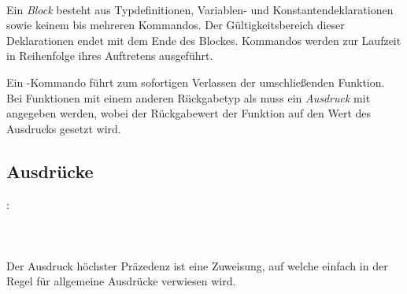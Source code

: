 \hspace*{1cm}\glq{}\grq {}  \glq\Gt{;}\grq \\
\hspace*{1cm} \\
\hspace*{1cm} \\
\hspace*{1cm} \\
\hspace*{1cm}\glq\Gt{\{}\grq  \glq\Gt{\}}\grq \\
\hspace*{1cm}\glq\Gt{\{}\grq {}  \glq\Gt{\}}\grq \\

Ein \emph{Block} besteht aus Typdefinitionen, Variablen- und Konstantendeklarationen sowie keinem bis mehreren Kommandos.
Der Gültigkeitsbereich dieser Deklarationen endet mit dem Ende des Blockes. Kommandos werden zur Laufzeit in Reihenfolge ihres
Auftretens ausgeführt.

Ein -Kommando führt zum sofortigen Verlassen der umschließenden Funktion.
Bei Funktionen mit einem anderen Rückgabetyp als  muss ein \emph{Ausdruck} mit angegeben
werden, wobei der Rückgabewert der Funktion auf den Wert des Ausdrucks gesetzt wird.

\subsection{Ausdrücke}\label{Ausdruecke}
:\label{ausdruck}\\
\hspace*{1cm} \\
\hspace*{1cm}  \\
\hspace*{1cm}  \\

Der Ausdruck höchster Präzedenz ist eine Zuweisung, auf welche einfach in der Regel für
allgemeine Ausdrücke verwiesen wird.



